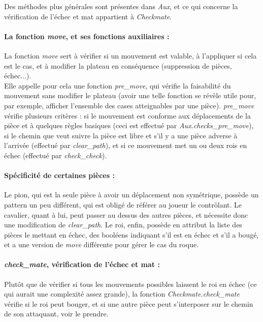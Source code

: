 \documentclass[a4paper]{article}
\begin{document}
Des méthodes plus générales sont présentes dans \textit{Aux}, et ce qui concerne la vérification de l'échec et mat appartient à \textit{Checkmate}.

\paragraph{La fonction \textit{move}, et ses fonctions auxiliaires :} La fonction \textit{move} sert à vérifier si un mouvement est valable, à l'appliquer si cela est le cas, et à modifier la plateau en conséquence (suppression de pièces, échec...). \\

Elle appelle pour cela une fonction \textit{pre\_move}, qui vérifie la faisabilité du mouvement sans modifier le plateau (avoir une telle fonction se révèle utile pour, par exemple, afficher l'ensemble des cases atteignables par une pièce).
\textit{pre\_move} vérifie plusieurs critères : si le mouvement est conforme aux déplacements de la pièce et à quelques règles basiques (ceci est effectué par \textit{Aux.checks\_pre\_move}), si le chemin que veut suivre la pièce est libre et s'il y a une pièce adverse à l'arrivée (effectué par \textit{clear\_path}), et si ce mouvement met un ou deux rois en échec (effectué par \textit{check\_check}).

\paragraph{Spécificité de certaines pièces :} Le pion, qui est la seule pièce à avoir un déplacement non symétrique, possède un pattern un peu différent, qui est obligé de référer au joueur le contrôlant.
Le cavalier, quant à lui, peut passer au dessus des autres pièces, et nécessite donc une modification de \textit{clear\_path}.
Le roi, enfin, possède en attribut la liste des pièces le mettant en échec, des booléens indiquant s'il est en échec et s'il a bougé, et a une version de \textit{move} différente pour gérer le cas du roque. 

\paragraph{\textit{check\_mate}, vérification de l'échec et mat :} Plutôt que de vérifier si tous les mouvements possibles laissent le roi en échec (ce qui aurait une complexité assez grande), la fonction \textit{Checkmate.check\_mate} vérifie si le roi peut bouger, et si une autre pièce peut s'interposer sur le chemin de son attaquant, voir le prendre.
\end{document}
